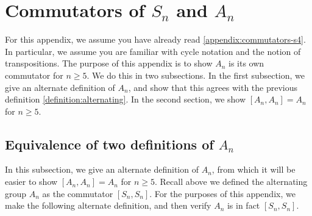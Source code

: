 \documentclass[reqno, 12pt, letter]{article}
\theoremstyle{plain}
\theoremstyle{definition}
\theoremstyle{remark}
\numberwithin{equation}{section}
\begin{document}
\newpage
\section{Commutators of $S_n$ and $A_n$}
\label{appendix:alternating}

For this appendix, we assume you have already read \autoref{appendix:commutators-s4}. In particular, we assume you are familiar with cycle notation
and the notion of transpositions.
The purpose of this appendix is to show $A_n$ is its own commutator for $n \geq 5$.
We do this in two subsections. In the first subsection, we give an alternate definition of $A_n$, and show that this agrees with the previous
definition \autoref{definition:alternating}. In the second section, we show $\left[ A_n, A_n \right] = A_n$ for $n \geq 5$.

\subsection{Equivalence of two definitions of $A_n$}

In this subsection, we give an alternate definition of $A_n$, from which it will be easier to show $\left[ A_n, A_n \right] = A_n$ for $n \geq 5$.
Recall above we defined the alternating group $A_n$ as the commutator $[S_n, S_n]$. For the purposes of this appendix,
we make the following alternate definition, and then verify $A_n$ is in fact $[S_n,S_n].$
\end{document}
